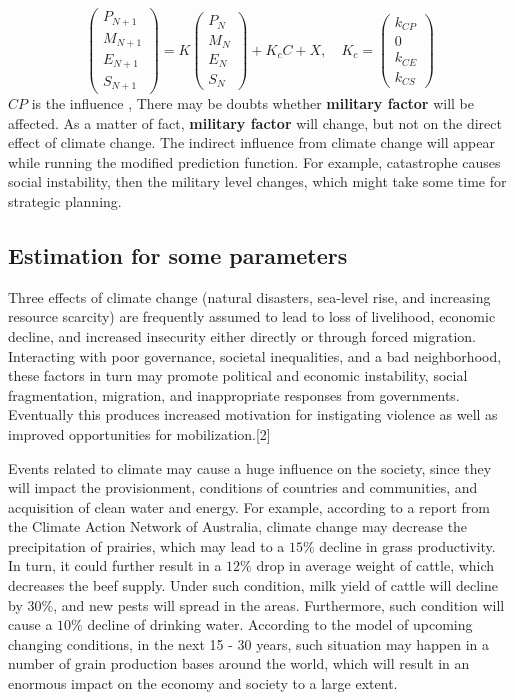 \documentclass{mcmthesis}
\begin{document}
	$$
	\left(
	\begin{matrix}
	P_{N+1} \\ M_{N+1} \\ E_{N+1} \\ S_{N+1}
	\end{matrix}
	\right) 
	= 
	K 
	\left(
	\begin{matrix}
	P_N \\ M_N \\ E_N \\ S_N
	\end{matrix}
	\right) 
	+
	K_c
	C
	+ X
	, \quad
	K_c = 
	\left(
	\begin{matrix}
	k_{CP} \\ {0} \\ k_{CE} \\ k_{CS}
	\end{matrix}
	\right)
	$$
	$CP$ is the influence , There may be doubts whether \textbf{military factor} will be affected. As a matter of fact, \textbf{military factor} will change, but not on the direct effect of climate change. The indirect influence from climate change will appear while running the modified prediction function. For example, catastrophe causes social instability, then the military level changes, which might take some time for strategic planning.
	
	
	\subsection{Estimation for some parameters}
	Three effects of climate change (natural disasters, sea-level rise, and increasing resource scarcity) are frequently assumed to lead to loss of livelihood, economic decline, and increased insecurity either directly or through forced migration. Interacting with poor governance, societal inequalities, and a bad neighborhood, these factors in turn may promote
	political and economic instability, social fragmentation, migration, and inappropriate responses from governments. Eventually this produces increased motivation for instigating violence as well as improved opportunities for mobilization.[2]
	
	Events related to climate may cause a huge influence on the society, since they will impact the provisionment, conditions of countries and communities, and acquisition of clean water and energy. For example, according to a report from the Climate Action Network of Australia, climate change may decrease the precipitation of prairies, which may lead to a $15\%$ decline in grass productivity. In turn, it could further result in a $12\%$ drop in average weight of cattle, which decreases the beef supply. Under such condition, milk yield of cattle will decline by $30\%$, and new pests will spread in the areas. Furthermore, such condition will cause a $10\%$ decline of drinking water. According to the model of upcoming changing conditions, in the next 15 - 30 years, such situation may happen in a number of grain production bases around the world, which will result in an enormous impact on the economy and society to a large extent. 
	
\end{document}

